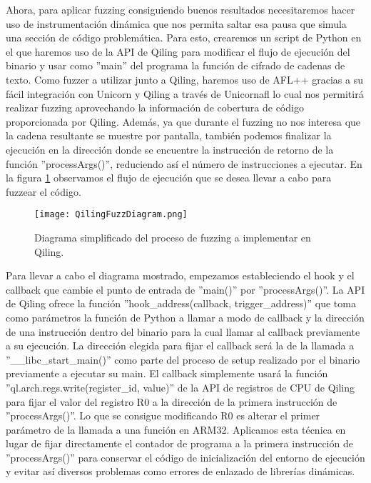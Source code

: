 Ahora, para aplicar fuzzing consiguiendo buenos resultados necesitaremos hacer uso de instrumentación dinámica que nos permita saltar esa pausa que 
simula una sección de código problemática. Para esto, crearemos un script de Python en el que haremos uso de la API de Qiling para modificar
el flujo de ejecución del binario y usar como ''main'' del programa la función de cifrado de cadenas de texto. Como fuzzer a utilizar junto a Qiling, 
haremos uso de AFL++ gracias a su fácil integración con Unicorn y Qiling a través de Unicornafl lo cual nos permitirá realizar fuzzing aprovechando la 
información de cobertura de código proporcionada por Qiling. Además, ya que durante el fuzzing 
no nos interesa que la cadena resultante se muestre por pantalla, también podemos finalizar la ejecución en la dirección donde se encuentre la instrucción
de retorno de la función ''processArgs()'', reduciendo así el número de instrucciones a ejecutar. En la figura \ref{fig:QilingFuzzDiagram} observamos el
flujo de ejecución que se desea llevar a cabo para fuzzear el código.

\begin{figure}[H]
    \centering
    \texttt{[image: QilingFuzzDiagram.png]}
    \caption{Diagrama simplificado del proceso de fuzzing a implementar en Qiling.}
    \label{fig:QilingFuzzDiagram}
\end{figure}

Para llevar a cabo el diagrama mostrado, empezamos estableciendo el hook y el callback que cambie el punto de entrada de ''main()'' por ''processArgs()''.
La API de Qiling ofrece la función ''hook\_address(callback, trigger\_address)'' que toma como parámetros la función de Python a llamar a modo de callback 
y la dirección de una instrucción dentro del binario para la cual llamar al callback previamente a su ejecución. La dirección elegida para fijar el callback 
será la de la llamada a ''\_\_libc\_start\_main()'' como parte del proceso de setup realizado por el binario previamente a ejecutar su main. El callback
simplemente usará la función ''ql.arch.regs.write(register\_id, value)'' de la API de registros de CPU de Qiling para fijar el valor del registro R0 a la dirección de la primera 
instrucción de ''processArgs()''. Lo que se consigue modificando R0 es alterar el primer parámetro de la llamada a una función en ARM32. Aplicamos esta
técnica en lugar de fijar directamente el contador de programa a la primera instrucción de ''processArgs()'' para conservar el código 
de inicialización del entorno de ejecución y evitar así diversos problemas como errores de enlazado de librerías dinámicas.\bigskip

